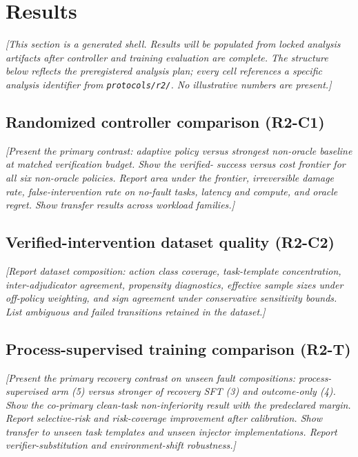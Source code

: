 \section{Results}
\label{sec:results}

\textit{[This section is a generated shell. Results will be populated from
locked analysis artifacts after controller and training evaluation are
complete. The structure below reflects the preregistered analysis plan;
every cell references a specific analysis identifier from
\texttt{protocols/r2/}. No illustrative numbers are present.]}

\subsection{Randomized controller comparison (R2-C1)}

\textit{[Present the primary contrast: adaptive policy versus strongest
non-oracle baseline at matched verification budget. Show the verified-
success versus cost frontier for all six non-oracle policies. Report area
under the frontier, irreversible damage rate, false-intervention rate on
no-fault tasks, latency and compute, and oracle regret. Show transfer
results across workload families.]}

\subsection{Verified-intervention dataset quality (R2-C2)}

\textit{[Report dataset composition: action class coverage, task-template
concentration, inter-adjudicator agreement, propensity diagnostics,
effective sample sizes under off-policy weighting, and sign agreement
under conservative sensitivity bounds. List ambiguous and failed
transitions retained in the dataset.]}

\subsection{Process-supervised training comparison (R2-T)}

\textit{[Present the primary recovery contrast on unseen fault compositions:
process-supervised arm (5) versus stronger of recovery SFT (3) and
outcome-only (4). Show the co-primary clean-task non-inferiority result
with the predeclared margin. Report selective-risk and risk-coverage
improvement after calibration. Show transfer to unseen task templates
and unseen injector implementations. Report verifier-substitution and
environment-shift robustness.]}

